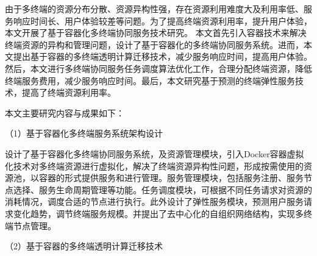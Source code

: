 由于多终端的资源分布分散、资源异构性强，存在资源利用难度大及利用率低、服务响应时间长、用户体验较差等问题。为了提高终端资源利用率，提升用户体验，本文开展了基于容器化多终端协同服务技术研究。
本文首先引入容器技术来解决终端资源的异构和管理问题，设计了基于容器化的多终端协同服务系统。进而，本文提出基于容器的多终端透明计算迁移技术，减少服务响应时间，提高用户体验。然后，本文进行多终端协同服务任务调度算法优化工作，合理分配终端资源，降低终端服务费用，减少服务响应时间。最后，本文研究基于预测的终端弹性服务技术，提高了终端资源利用率。

本文主要研究内容与成果如下： 

（1）基于容器化多终端服务系统架构设计

设计了基于容器化多终端协同服务系统，及资源管理模块，引入Docker容器虚拟化技术对多终端资源进行虚拟化，解决了终端资源异构性问题，形成按需使用的资源池，以容器的形式提供服务和进行管理。服务管理模块，包括服务注册、服务节点选择、服务生命周期管理等功能。任务调度模块，可根据不同任务请求对资源的消耗情况，调度合适的节点进行执行。此外设计了弹性服务模块，预测用户服务请求变化趋势，调节终端服务规模。并提出了去中心化的自组织网络结构，实现多终端节点管理。

（2）基于容器的多终端透明计算迁移技术

